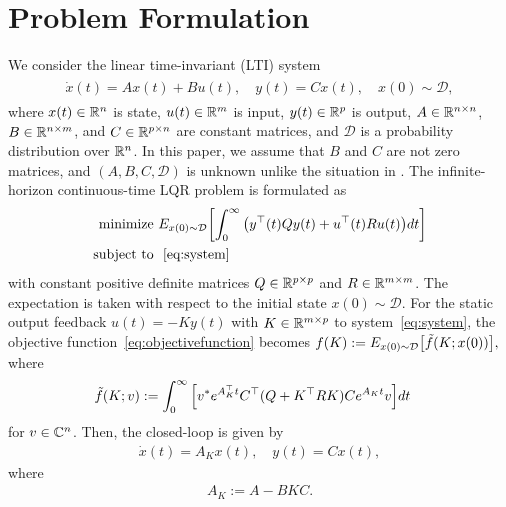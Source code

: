 % 
\section{Problem Formulation}\label{sec:problem}
We consider the linear time-invariant (LTI) system
\begin{align}
  \begin{aligned}
    \dot x(t) = Ax(t)+Bu(t), \quad
    y(t)     = C x(t),\quad
    x(0) \sim \mathcal D,
  \end{aligned}\label{eq:system}
\end{align}
where $x(t) \in \mathbb{R}^n$ is state, $u(t)\in \mathbb{R}^m$ is input,
$y(t)\in \mathbb{R}^p$ is output, $A\in \mathbb{R}^{n\times n}$,
$B\in \mathbb{R}^{n\times m}$, and $C \in \mathbb{R}^{p\times n}$ are constant matrices, and $\mathcal D$ is a probability distribution over $\mathbb{R}^n$.
In this paper, we assume that $B$ and $C$ are not zero matrices,
and
$(A, B, C, \mathcal {D})$
is unknown unlike the situation in \cite{fatkhullin2021optimizing}.
The infinite-horizon continuous-time LQR problem is formulated as
\begin{align}
  \mathop{\text{minimize }}\limits  & E_{x(0)\sim \mathcal{D}}\qty[\int_0^\infty \qty(y^\top(t) Q y(t) + u^\top(t) R u(t))dt ] \label{eq:objectivefunction} \\
  \mathop{\text{subject to }} & ~\eqref{eq:system}
\end{align}
with constant positive definite matrices $Q \in \mathbb{R}^{p\times p}$ and $R\in \mathbb{R}^{m\times m}$.
The expectation is taken with respect to the initial state $x(0) \sim \mathcal{D}$.
For the static output feedback $u(t) = -Ky(t)$ with $K\in \mathbb{R}^{m\times p}$ to system~\eqref{eq:system},
the objective function~\eqref{eq:objectivefunction} becomes
$
  f(K) := E_{x(0)\sim \mathcal{D}}\qty[\tilde{f}(K;x(0))],
$
where 
\begin{align}
  \tilde f(K;v) & := \int_0^\infty \qty[v^* e^{A_K^\top t}C^\top(Q+ K^\top RK)Ce^{A_K t}v]dt\label{eq:cost}
\end{align}
for $v\in \mathbb{C}^n$.
Then, the closed-loop is given by
\begin{align}
    \dot x(t)  = A_Kx(t),\quad
    y(t)          = Cx(t), \label{eq:closedloop}
\end{align}
where 
\begin{align}
  A_K := A-BKC. \label{eq:AK}
\end{align}



